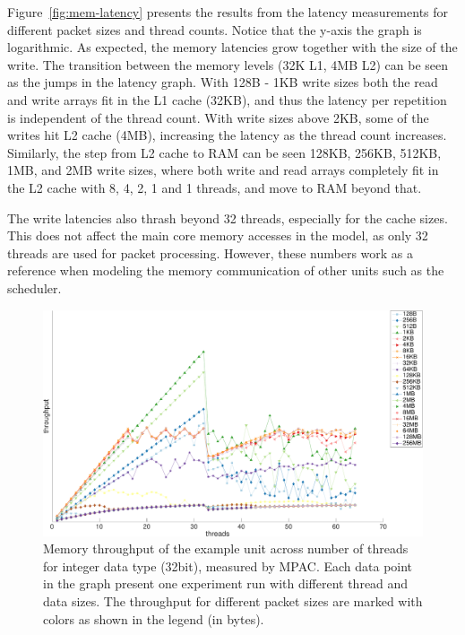 Figure~\ref{fig:mem-latency} presents the results from the latency measurements for different packet sizes and thread counts. Notice that the y-axis the graph is logarithmic. As expected, the memory latencies grow together with the size of the write. The transition between the memory levels (32K L1, 4MB L2) can be seen as the jumps in the latency graph. With 128B - 1KB write sizes both the read and write arrays fit in the L1 cache (32KB), and thus the latency per repetition is independent of the thread count. With write sizes above 2KB, some of the writes hit L2 cache (4MB), increasing the latency as the thread count increases. Similarly, the step from L2 cache to RAM can be seen 128KB, 256KB, 512KB, 1MB, and 2MB write sizes, where both write and read arrays completely fit in the L2 cache with 8, 4, 2, 1 and 1 threads, and move to RAM beyond that.

The write latencies also thrash beyond 32 threads, especially for the cache sizes. This does not affect the main core memory accesses in the model, as only 32 threads are used for packet processing. However, these numbers work as a reference when modeling the memory communication of other units such as the scheduler.

\begin{figure}[]
  \begin{center}
    \includegraphics[width=\textwidth]{images/mem-throughput.pdf}
    \caption{Memory throughput of the example unit across number of threads for integer data type (32bit), measured by MPAC. Each data point in the graph present one experiment run with different thread and data sizes. The throughput for different packet sizes are marked with colors as shown in the legend (in bytes).}
    \label{fig:mem-throughput}
  \end{center}
\end{figure}

